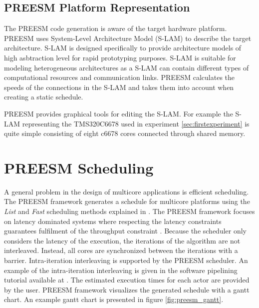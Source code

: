 \subsection{PREESM Platform Representation}
The PREESM code generation is aware of the target hardware platform. PREESM uses System-Level Architecture Model (S-LAM) \cite{pelcat2009system} to describe the target architecture. S-LAM is designed specifically to provide architecture models of high asbtraction level for rapid prototyping purposes. S-LAM is suitable for modeling heterogeneous architectures as a S-LAM can contain different types of computational resources and communication links. PREESM calculates the speeds of the connections in the S-LAM and takes them into account when creating a static schedule. \cite{pelcat2009system}

PREESM provides graphical tools for editing the S-LAM. For example the S-LAM representing the TMS320C6678 used in experiment \ref{sec:firstexperiment} is quite simple consisting of eight c6678 cores connected through shared memory.

\section{PREESM Scheduling}
\label{sec:preesmsched}
A general problem in the design of multicore applications is efficient scheduling. The PREESM framework generates a schedule for multicore platforms using the \textit{List} and \textit{Fast} scheduling methods explained in \cite{kwok1997high}. The PREESM framework focuses on latency dominated systems where respecting the latency constraints guarantees fulfilment of the throughput constraint \cite{pelcat2014preesm, ghamarian2006throughput}. Because the scheduler only considers the latency of the execution, the iterations of the algorithm are not interleaved. Instead, all cores are synchronized between the iterations with a barrier. Intra-iteration interleaving is supported by the PREESM scheduler. \cite{pelcat2014preesm} An example of the intra-iteration interleaving is given in the software pipelining tutorial available at \cite{preesm}. The estimated execution times for each actor are provided by the user. PREESM framework visualizes the generated schedule with a gantt chart. An example gantt chart is presented in figure \ref{fig:preesm_gantt}.\\ 
